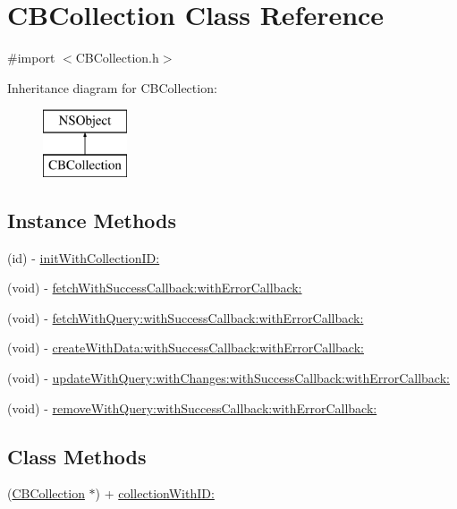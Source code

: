 \hypertarget{interface_c_b_collection}{\section{C\+B\+Collection Class Reference}
\label{interface_c_b_collection}
}


{\ttfamily \#import $<$C\+B\+Collection.\+h$>$}

Inheritance diagram for C\+B\+Collection\+:\begin{figure}[H]
\begin{center}
\leavevmode
\includegraphics[height=2.000000cm]{interface_c_b_collection}
\end{center}
\end{figure}
\subsection*{Instance Methods}
\begin{DoxyCompactItemize}
\item 
(id) -\/ \hyperlink{interface_c_b_collection_ad232890eefe5c505991479ac6f018f9a}{init\+With\+Collection\+I\+D\+:}
\item 
(void) -\/ \hyperlink{interface_c_b_collection_aebbdb37306fcfa13bcdc915c96c37297}{fetch\+With\+Success\+Callback\+:with\+Error\+Callback\+:}
\item 
(void) -\/ \hyperlink{interface_c_b_collection_ad0e9afe7d01f2bf95510b1e462d31f2d}{fetch\+With\+Query\+:with\+Success\+Callback\+:with\+Error\+Callback\+:}
\item 
(void) -\/ \hyperlink{interface_c_b_collection_a72a5135772c9829d253fb614887158b4}{create\+With\+Data\+:with\+Success\+Callback\+:with\+Error\+Callback\+:}
\item 
(void) -\/ \hyperlink{interface_c_b_collection_af556b08ec3e81638b50b0bc8e06a9938}{update\+With\+Query\+:with\+Changes\+:with\+Success\+Callback\+:with\+Error\+Callback\+:}
\item 
(void) -\/ \hyperlink{interface_c_b_collection_a020a60192df9f85305aea894a19ac9ec}{remove\+With\+Query\+:with\+Success\+Callback\+:with\+Error\+Callback\+:}
\end{DoxyCompactItemize}
\subsection*{Class Methods}
\begin{DoxyCompactItemize}
\item 
(\hyperlink{interface_c_b_collection}{C\+B\+Collection} $\ast$) + \hyperlink{interface_c_b_collection_ad0d5e667992df0fbeedc094edd29375b}{collection\+With\+I\+D\+:}
\end{DoxyCompactItemize}
